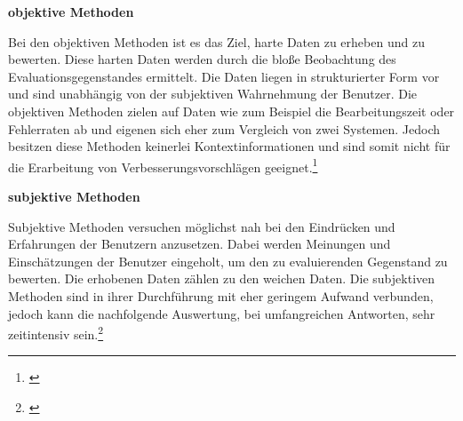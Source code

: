 \textbf{objektive Methoden}

Bei den objektiven Methoden ist es das Ziel, \glqq harte \grqq{} Daten zu erheben und zu bewerten. Diese harten Daten werden durch die bloße Beobachtung des Evaluationsgegenstandes ermittelt. Die Daten liegen in strukturierter Form vor und sind unabhängig von der subjektiven Wahrnehmung der Benutzer. Die objektiven Methoden zielen auf Daten wie zum Beispiel die Bearbeitungszeit oder Fehlerraten ab und eigenen sich eher zum Vergleich von zwei Systemen. Jedoch besitzen diese Methoden keinerlei Kontextinformationen und sind somit nicht für die Erarbeitung von Verbesserungsvorschlägen geeignet.\footnote{\cite[vgl.][17]{Hegner2003}}

\textbf{subjektive Methoden}

Subjektive Methoden versuchen möglichst nah bei den Eindrücken und Erfahrungen der Benutzern anzusetzen. Dabei werden Meinungen und Einschätzungen der Benutzer eingeholt, um den zu evaluierenden Gegenstand zu bewerten. Die erhobenen Daten zählen zu den \glqq weichen \grqq{} Daten. Die subjektiven Methoden sind in ihrer Durchführung mit eher geringem Aufwand verbunden, jedoch kann die nachfolgende Auswertung, bei umfangreichen Antworten, sehr zeitintensiv sein.\footnote{\cite[vgl.][18]{Hegner2003}}

